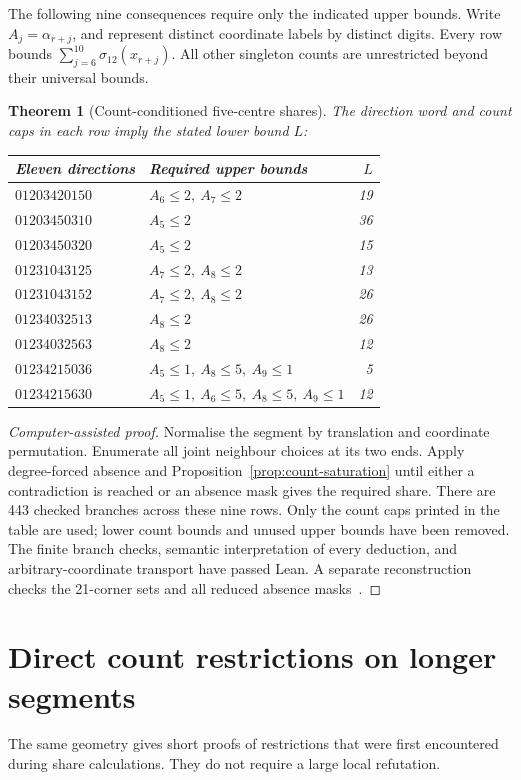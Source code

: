 \documentclass[11pt,a4paper]{article}
\newtheorem{theorem}{Theorem}[section]
\theoremstyle{definition}
\theoremstyle{remark}
\begin{document}
The following nine consequences require only the indicated upper bounds. Write $A_j=\alpha_{r+j}$, and represent distinct coordinate labels by distinct digits. Every row bounds $\sum_{j=6}^{10}\sigma_{12}(x_{r+j})$. All other singleton counts are unrestricted beyond their universal bounds.
\begin{theorem}[Count-conditioned five-centre shares]\label{thm:saturated-shares}
The direction word and count caps in each row imply the stated lower bound $L$:
\begin{center}\small
\begin{tabular}{l l r}
\toprule
Eleven directions & Required upper bounds & $L$\\\midrule
$01203420150$ & $A_{6}\le2,\ A_{7}\le2$ & 19\\
$01203450310$ & $A_{5}\le2$ & 36\\
$01203450320$ & $A_{5}\le2$ & 15\\
$01231043125$ & $A_{7}\le2,\ A_{8}\le2$ & 13\\
$01231043152$ & $A_{7}\le2,\ A_{8}\le2$ & 26\\
$01234032513$ & $A_{8}\le2$ & 26\\
$01234032563$ & $A_{8}\le2$ & 12\\
$01234215036$ & $A_{5}\le1,\ A_{8}\le5,\ A_{9}\le1$ & 5\\
$01234215630$ & $A_{5}\le1,\ A_{6}\le5,\ A_{8}\le5,\ A_{9}\le1$ & 12\\
\bottomrule
\end{tabular}
\end{center}
\end{theorem}
\begin{proof}[Computer-assisted proof]
Normalise the segment by translation and coordinate permutation. Enumerate all joint neighbour choices at its two ends. Apply degree-forced absence and Proposition~\ref{prop:count-saturation} until either a contradiction is reached or an absence mask gives the required share. There are 443 checked branches across these nine rows. Only the count caps printed in the table are used; lower count bounds and unused upper bounds have been removed. The finite branch checks, semantic interpretation of every deduction, and arbitrary-coordinate transport have passed Lean. A separate reconstruction checks the 21-corner sets and all reduced absence masks~\cite{choicearchive}.
\end{proof}

\section{Direct count restrictions on longer segments}\label{sec:long-counts}
The same geometry gives short proofs of restrictions that were first encountered during share calculations. They do not require a large local refutation.
\end{document}
